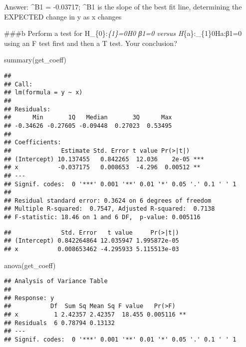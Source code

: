 \documentclass[
]{article}
\newenvironment{Shaded}{\begin{snugshade}}{\end{snugshade}}
\newcommand{\DecValTok}[1]{\textcolor[rgb]{0.00,0.00,0.81}{#1}}
\newcommand{\FunctionTok}[1]{\textcolor[rgb]{0.00,0.00,0.00}{#1}}
\newcommand{\NormalTok}[1]{#1}
\newcommand{\SpecialCharTok}[1]{\textcolor[rgb]{0.00,0.00,0.00}{#1}}
\begin{document}
Answer: \^{}B1 = -0.03717; \^{}B1 is the slope of the best fit line,
determining the EXPECTED change in y as x changes

\#\#\#b Perform a test for H\_\{0\}:\beta\emph{\{1\}=0H0 β1=0 versus
H}\{a\}:\beta\_\{1\}\neq0Ha:β1=0 using an F test first and then a T
test. Your conclusion?

\begin{Shaded}
\begin{Highlighting}[]
\FunctionTok{summary}\NormalTok{(get\_coeff)}
\end{Highlighting}
\end{Shaded}

\begin{verbatim}
## 
## Call:
## lm(formula = y ~ x)
## 
## Residuals:
##      Min       1Q   Median       3Q      Max 
## -0.34626 -0.27605 -0.09448  0.27023  0.53495 
## 
## Coefficients:
##              Estimate Std. Error t value Pr(>|t|)    
## (Intercept) 10.137455   0.842265  12.036    2e-05 ***
## x           -0.037175   0.008653  -4.296  0.00512 ** 
## ---
## Signif. codes:  0 '***' 0.001 '**' 0.01 '*' 0.05 '.' 0.1 ' ' 1
## 
## Residual standard error: 0.3624 on 6 degrees of freedom
## Multiple R-squared:  0.7547, Adjusted R-squared:  0.7138 
## F-statistic: 18.46 on 1 and 6 DF,  p-value: 0.005116
\end{verbatim}

\begin{Shaded}
\end{Shaded}

\begin{verbatim}
##              Std. Error   t value     Pr(>|t|)
## (Intercept) 0.842264864 12.035947 1.995872e-05
## x           0.008653462 -4.295933 5.115513e-03
\end{verbatim}

\begin{Shaded}
\begin{Highlighting}[]
\FunctionTok{anova}\NormalTok{(get\_coeff)}
\end{Highlighting}
\end{Shaded}

\begin{verbatim}
## Analysis of Variance Table
## 
## Response: y
##           Df  Sum Sq Mean Sq F value   Pr(>F)   
## x          1 2.42357 2.42357  18.455 0.005116 **
## Residuals  6 0.78794 0.13132                    
## ---
## Signif. codes:  0 '***' 0.001 '**' 0.01 '*' 0.05 '.' 0.1 ' ' 1
\end{verbatim}
\end{document}
